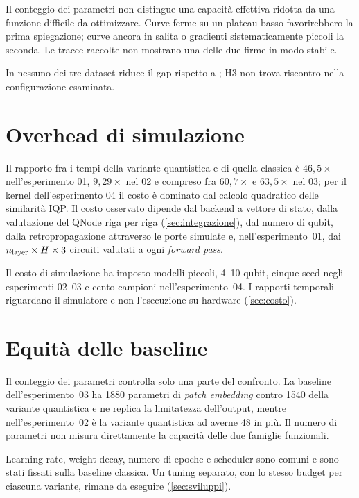 Il conteggio dei parametri non distingue una capacità effettiva ridotta da una
funzione difficile da ottimizzare. Curve ferme su un plateau basso favorirebbero
la prima spiegazione; curve ancora in salita o gradienti sistematicamente piccoli
la seconda. Le tracce raccolte non mostrano una delle due firme in modo stabile.

In nessuno dei tre dataset  riduce il gap rispetto a
; H3 non trova riscontro nella configurazione esaminata.

\section{Overhead di simulazione}
\label{sec:overhead}

Il rapporto fra i tempi della variante quantistica e di quella classica è
$46{,}5\times$ nell'esperimento 01, $9{,}29\times$ nel 02 e compreso fra
$60{,}7\times$ e $63{,}5\times$ nel 03; per il kernel dell'esperimento 04 il costo
è dominato dal calcolo quadratico delle similarità IQP. Il costo osservato dipende
dal backend a vettore di stato, dalla valutazione del QNode riga per riga
(\cref{sec:integrazione}), dal numero di qubit, dalla retropropagazione attraverso
le porte simulate e, nell'esperimento~01, dai
$n_{\text{layer}} \times H \times 3$ circuiti valutati a ogni
\emph{forward pass}.

Il costo di simulazione ha imposto modelli piccoli, 4--10 qubit, cinque seed
negli esperimenti 02--03 e cento campioni nell'esperimento~04. I rapporti
temporali riguardano il simulatore e non l'esecuzione su hardware
(\cref{sec:costo}).

\section{Equità delle baseline}
\label{sec:equita-baseline}

Il conteggio dei parametri controlla solo una parte del confronto. La baseline
dell'esperimento~03 ha \num{1880} parametri di
\emph{patch embedding} contro \num{1540} della variante quantistica e ne replica
la limitatezza dell'output, mentre nell'esperimento~02 è la variante quantistica
ad averne 48 in più. Il numero di parametri non misura direttamente la capacità
delle due famiglie funzionali.

Learning rate, weight decay, numero di epoche e scheduler sono comuni e sono
stati fissati sulla baseline classica. Un tuning separato, con lo stesso budget
per ciascuna variante, rimane da eseguire (\cref{sec:sviluppi}).

